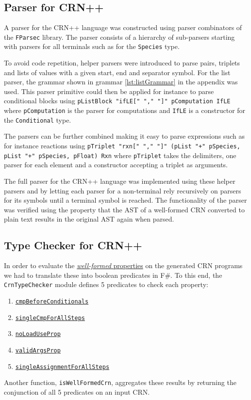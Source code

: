 \subsection{Parser for CRN++} %

A parser for the CRN++ language was constructed using parser combinators of the \texttt{FParsec} library. The parser consists of a hierarchy of sub-parsers starting with parsers for all terminals such as for the \texttt{Species} type.

To avoid code repetition, helper parsers were introduced to parse pairs, triplets and lists of values with a given start, end and separator symbol. For the list parser, the grammar shown in grammar \ref{lst:listGrammar} in the appendix was used. This parser primitive could then be applied for instance to parse conditional blocks using \texttt{pListBlock "ifLE[{" "," "}]" pComputation IfLE} where \texttt{pComputation} is the parser for computations and \texttt{IfLE} is a constructor for the \texttt{Conditional} type. 

The parsers can be further combined making it easy to parse expressions such as for instance reactions using \texttt{pTriplet "rxn[" "," "]" (pList "+" pSpecies, pList "+" pSpecies, pFloat) Rxn} where \texttt{pTriplet} takes the delimiters, one parser for each element and a constructor accepting a triplet as arguments.

The full parser for the CRN++ language was implemented using these helper parsers and by letting each parser for a non-terminal rely recursively on parsers for its symbols until a terminal symbol is reached. The functionality of the parser was verified using the property that the AST of a well-formed CRN converted to plain text results in the original AST again when parsed. 


\subsection{Type Checker for CRN++} %
In order to evaluate the \hyperref[sec:well-formed]{\textit{well-formed} properties} on the generated CRN programs we had to translate these into boolean predicates in F\#. To this end, the \texttt{CrnTypeChecker} module defines 5 predicates to check each property:
\begin{enumerate}
    \item \hyperref[prop:initCmp]{\texttt{cmpBeforeConditionals}}
    \item \hyperref[prop:singleCmp]{\texttt{singleCmpForAllSteps}}
    \item \hyperref[prop:noLoadUse]{\texttt{noLoadUseProp}}
    \item \hyperref[prop:notSameIO]{\texttt{validArgsProp}}
    \item \hyperref[prop:singleAssign]{\texttt{singleAssignmentForAllSteps}}
\end{enumerate}
Another function, \texttt{isWellFormedCrn}, aggregates these results by returning the conjunction of all 5 predicates on an input CRN. 

